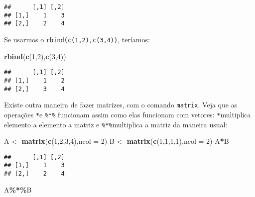 \documentclass[
]{book}
\newenvironment{Shaded}{\begin{snugshade}}{\end{snugshade}}
\newcommand{\DataTypeTok}[1]{\textcolor[rgb]{0.13,0.29,0.53}{#1}}
\newcommand{\DecValTok}[1]{\textcolor[rgb]{0.00,0.00,0.81}{#1}}
\newcommand{\KeywordTok}[1]{\textcolor[rgb]{0.13,0.29,0.53}{\textbf{#1}}}
\newcommand{\NormalTok}[1]{#1}
\newcommand{\OperatorTok}[1]{\textcolor[rgb]{0.81,0.36,0.00}{\textbf{#1}}}
\newcommand{\StringTok}[1]{\textcolor[rgb]{0.31,0.60,0.02}{#1}}
\begin{document}
\begin{verbatim}
##      [,1] [,2]
## [1,]    1    3
## [2,]    2    4
\end{verbatim}

Se usarmos o \texttt{rbind(c(1,2),c(3,4))}, teríamos:

\begin{Shaded}
\begin{Highlighting}[]
\KeywordTok{rbind}\NormalTok{(}\KeywordTok{c}\NormalTok{(}\DecValTok{1}\NormalTok{,}\DecValTok{2}\NormalTok{),}\KeywordTok{c}\NormalTok{(}\DecValTok{3}\NormalTok{,}\DecValTok{4}\NormalTok{))}
\end{Highlighting}
\end{Shaded}

\begin{verbatim}
##      [,1] [,2]
## [1,]    1    2
## [2,]    3    4
\end{verbatim}

Existe outra maneira de fazer matrizes, com o comando \texttt{matrix}. Veja que as operações \texttt{*}e \texttt{\%*\%} funcionam assim como elas funcionam com vetores: \texttt{*}multiplica elemento a elemento a matriz e \texttt{\%*\%}multiplica a matriz da maneira usual:

\begin{Shaded}
\begin{Highlighting}[]
\NormalTok{A \textless{}{-}}\StringTok{ }\KeywordTok{matrix}\NormalTok{(}\KeywordTok{c}\NormalTok{(}\DecValTok{1}\NormalTok{,}\DecValTok{2}\NormalTok{,}\DecValTok{3}\NormalTok{,}\DecValTok{4}\NormalTok{),}\DataTypeTok{ncol =} \DecValTok{2}\NormalTok{)}
\NormalTok{B \textless{}{-}}\StringTok{ }\KeywordTok{matrix}\NormalTok{(}\KeywordTok{c}\NormalTok{(}\DecValTok{1}\NormalTok{,}\DecValTok{1}\NormalTok{,}\DecValTok{1}\NormalTok{,}\DecValTok{1}\NormalTok{),}\DataTypeTok{ncol =} \DecValTok{2}\NormalTok{)}
\NormalTok{A}\OperatorTok{*}\NormalTok{B}
\end{Highlighting}
\end{Shaded}

\begin{verbatim}
##      [,1] [,2]
## [1,]    1    3
## [2,]    2    4
\end{verbatim}

\begin{Shaded}
\begin{Highlighting}[]
\NormalTok{A}\OperatorTok{\%*\%}\NormalTok{B}
\end{Highlighting}
\end{Shaded}
\end{document}
